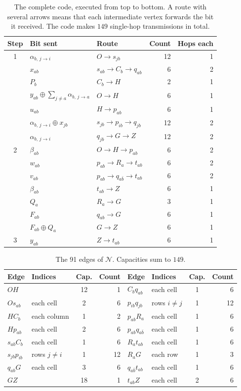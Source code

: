 \documentclass[11pt]{article}
\newcommand{\al}[3]{\alpha_{#1,\,#2\to#3}}
\begin{document}
\begin{table}[ht]
\centering
\begin{tabular}{@{}c l l r r@{}}
\toprule
Step & Bit sent & Route & Count & Hops each\\
\midrule
1 & $\al{b}{j}{i}$ & $O\to s_{jb}$ & 12 & 1\\
  & $x_{ab}$ & $s_{ab}\to C_b\to q_{ab}$ & 6 & 2\\
  & $P_b$ & $C_b\to H$ & 2 & 1\\
  & $y_{ab}\oplus\sum_{j\neq a}\al{b}{j}{a}$ & $O\to H$ & 6 & 1\\
  & $u_{ab}$ & $H\to p_{ab}$ & 6 & 1\\
  & $\al{b}{j}{i}\oplus x_{jb}$ & $s_{jb}\to p_{ib}\to q_{jb}$ & 12 & 2\\
  & $\al{b}{j}{i}$ & $q_{jb}\to G\to Z$ & 12 & 2\\
\midrule
2 & $\beta_{ab}$ & $O\to H\to p_{ab}$ & 6 & 2\\
  & $w_{ab}$ & $p_{ab}\to R_a\to t_{ab}$ & 6 & 2\\
  & $v_{ab}$ & $p_{ab}\to q_{a\bar b}\to t_{ab}$ & 6 & 2\\
  & $\beta_{ab}$ & $t_{ab}\to Z$ & 6 & 1\\
  & $Q_a$ & $R_a\to G$ & 3 & 1\\
  & $F_{ab}$ & $q_{ab}\to G$ & 6 & 1\\
  & $F_{ab}\oplus Q_a$ & $G\to Z$ & 6 & 1\\
\midrule
3 & $y_{ab}$ & $Z\to t_{ab}$ & 6 & 1\\
\bottomrule
\end{tabular}
\caption{The complete code, executed from top to bottom. A route with several arrows means that each intermediate vertex forwards the bit it received. The code makes $149$ single-hop transmissions in total.}
\label{tab:protocol}
\end{table}

\begin{table}[ht]
\centering
\begin{tabular}{@{}l l c r@{\qquad}l l c r@{}}
\toprule
Edge & Indices & Cap. & Count & Edge & Indices & Cap. & Count\\
\midrule
$OH$ & & 12 & 1 & $C_bq_{ab}$ & each cell & 1 & 6\\
$Os_{ab}$ & each cell & 2 & 6 & $p_{ib}q_{jb}$ & rows $i\neq j$ & 1 & 12\\
$HC_b$ & each column & 1 & 2 & $p_{ab}R_a$ & each cell & 1 & 6\\
$Hp_{ab}$ & each cell & 2 & 6 & $p_{ab}q_{a\bar b}$ & each cell & 1 & 6\\
$s_{ab}C_b$ & each cell & 1 & 6 & $R_at_{ab}$ & each cell & 1 & 6\\
$s_{jb}p_{ib}$ & rows $j\neq i$ & 1 & 12 & $R_aG$ & each row & 1 & 3\\
$q_{ab}G$ & each cell & 3 & 6 & $q_{a\bar b}t_{ab}$ & each cell & 1 & 6\\
$GZ$ & & 18 & 1 & $t_{ab}Z$ & each cell & 2 & 6\\
\bottomrule
\end{tabular}
\caption{The 91 edges of $\mathcal N$. Capacities sum to $149$.}
\label{tab:edges}
\end{table}
\end{document}
